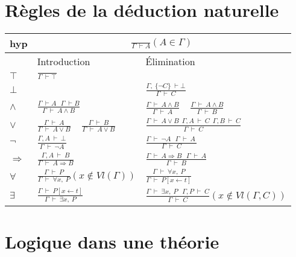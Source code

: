 \documentclass[11pt,a4paper]{article}
\begin{document}
\section{Règles de la déduction naturelle}

\begin{tabular}{|C{3cm}|C{6cm}|C{7cm}|}
  \hline
  hyp &   \\
  \hline
  & Introduction & Élimination \\
  \hline
  $\top$ & {\Large $\frac{}{\Gamma \ \vdash \top }$} & \\
  \hline
  $\bot$ & & {\Large $\frac{\Gamma,\ \{\lnot C \} \ \vdash \bot}{\Gamma \ \vdash \ C}$} \\
  \hline
  $\land$ & {\Large $\frac{\Gamma \ \vdash A \ \ \ \Gamma \ \vdash B}{\Gamma \ \vdash \ A \land B}$} & {\Large $\frac{\Gamma \  \vdash \ A\land B }{\Gamma \  \vdash \ A }$} $ \ \ $ {\Large $\frac{\Gamma \  \vdash \ A\land B }{\Gamma \  \vdash \ B }$} \\
  \hline
  $\lor$ & {\Large $\frac{\Gamma \  \vdash \ A }{\Gamma \  \vdash \ A\lor B }$} $ \ \ $ {\Large $\frac{\Gamma \  \vdash \ B }{\Gamma \  \vdash \ A\lor B }$} & {\Large $\frac{\Gamma \  \vdash \ A \lor B \ \ \Gamma,A \ \vdash \ C \ \ \Gamma,B \ \vdash \ C}{\Gamma \  \vdash \ C  }$} \\
  \hline
  $\lnot$ & {\Large $\frac{\Gamma,A \  \vdash \ \bot  }{\Gamma \  \vdash \ \lnot A }$}  & {\Large $\frac{\Gamma \ \vdash \ \lnot A \ \ \ \Gamma \ \vdash \ A \  }{\Gamma \  \vdash \ C }$} \\
  \hline
  $\Rightarrow$ & {\Large $\frac{\Gamma,A \  \vdash \ B }{\Gamma \  \vdash \ A \Rightarrow B  }$} & {\Large $\frac{\Gamma \  \vdash \ A \Rightarrow B \ \ \ \Gamma \ \vdash \ A }{\Gamma \  \vdash \ B }$} \\
  \hline
  $\forall$ & {\Large $\frac{\Gamma \  \vdash \ P }{\Gamma \  \vdash \  \forall x, \ P}$}$(x \notin Vl(\Gamma))$ & {\Large $\frac{\Gamma \  \vdash \ \forall x, \ P }{\Gamma \  \vdash \ P[x \leftarrow t]  }$}\\
  \hline
  $\exists$ & {\Large $\frac{\Gamma \  \vdash \ P[x\leftarrow t] }{\Gamma \  \vdash \ \exists x, \ P }$} & {\Large $\frac{\Gamma \  \vdash \ \exists x, \ P \ \ \ \Gamma, P \ \vdash \ C  }{\Gamma \  \vdash \ C }$}$(x \notin Vl(\Gamma,C))$ \\
  \hline
\end{tabular}

\section{Logique dans une théorie}
\end{document}
